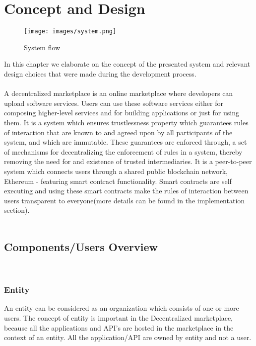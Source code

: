 \chapter{Concept and Design}
\label{cha:conceptanddesign}

\begin{figure}
    
    \centering
\texttt{[image: images/system.png]}
\caption{System flow}\label{fig:example2}

\end{figure}

In this chapter we elaborate on the concept of the presented system and relevant design choices that were made during the development process.\\\\
A decentralized marketplace is an online marketplace where developers can upload software services. Users can use these software services either for composing higher-level services and for building applications or just for using them. It is a system which ensures trustlessness property which guarantees rules of interaction that are known to and agreed upon by all participants of the system, and which are immutable. These guarantees are enforced through, a set of mechanisms for decentralizing the enforcement of rules in a system, thereby removing the need for and existence of trusted intermediaries.\cite{Klems2017TrustlessII} It is a peer-to-peer system which connects users through a shared public blockchain network, Ethereum - featuring smart contract functionality. Smart contracts are self executing and using these smart contracts make the rules of interaction between users transparent to everyone(more details can be found in the implementation section).\\\\ 
\section{Components/Users Overview}\\

\subsection{Entity}
An entity can be considered as an organization which consists of one or more users. The concept of entity is important in the Decentralized marketplace, because all the applications and API's are hosted in the marketplace in the context of an entity. All the application/API are owned by entity and not a user. 
